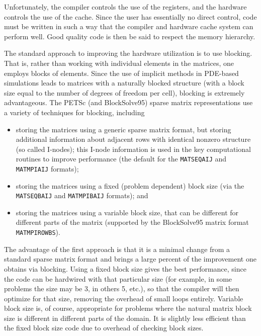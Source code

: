 \documentclass[twoside,12pt]{../sty/report_petsc}
\begin{document}
Unfortunately, the compiler controls the use of the registers, and the
hardware controls the use of the cache. Since the user has essentially
no direct control, code must be written in such a way that the
compiler and hardware cache system can perform well. Good quality code
is then be said to respect the memory hierarchy.

The standard approach to improving the hardware utilization is to use
blocking. That is, rather than working with individual elements in
the matrices, one employs blocks of elements.  Since the use of
implicit methods in PDE-based simulations leads to matrices with a
naturally blocked structure (with a block size equal to the number of
degrees of freedom per cell), blocking is extremely advantageous.  The
PETSc (and BlockSolve95) sparse matrix representations use a variety
of techniques for blocking, including

\begin{itemize}
\item storing the matrices using a generic sparse matrix format, but 
   storing additional information about adjacent rows with identical 
   nonzero structure (so called I-nodes); this I-node information is 
   used in the key computational routines to improve performance
   (the default for the {\tt MATSEQAIJ} and {\tt MATMPIAIJ} formats);
\item storing the matrices using a fixed (problem dependent) block size
   (via the {\tt MATSEQBAIJ} and {\tt MATMPIBAIJ} formats); and
\item storing the matrices using a variable block size, that can be 
   different for different parts of the matrix
   (supported by the BlockSolve95 matrix format {\tt MATMPIROWBS}).
\end{itemize}

The advantage of the first approach is that it is a minimal change
from a standard sparse matrix format and brings a large percent of the
improvement one obtains via blocking.  Using a fixed block size gives
the best performance, since the code can be hardwired with that
particular size (for example, in some problems the size may be 3, in
others 5, etc.), so that the compiler will then optimize for that
size, removing the overhead of small loops entirely. Variable block
size is, of course, appropriate for problems where the natural matrix
block size is different in different parts of the domain. It is
slightly less efficient than the fixed block size code due to overhead
of checking block sizes.
\end{document}
